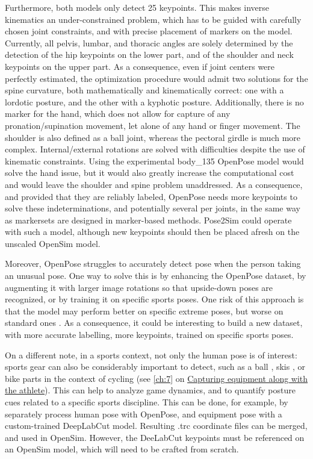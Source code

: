 Furthermore, both models only detect 25 keypoints. This makes inverse kinematics an under-constrained problem, which has to be guided with carefully chosen joint constraints, and with precise placement of markers on the model. Currently, all pelvis, lumbar, and thoracic angles are solely determined by the detection of the hip keypoints on the lower part, and of the shoulder and neck keypoints on the upper part. As a consequence, even if joint centers were perfectly estimated, the optimization procedure would admit two solutions for the spine curvature, both mathematically and kinematically correct: one with a lordotic posture, and the other with a kyphotic posture. Additionally, there is no marker for the hand, which does not allow for capture of any pronation/supination movement, let alone of any hand or finger movement. The shoulder is also defined as a ball joint, whereas the pectoral girdle is much more complex. Internal/external rotations are solved with difficulties despite the use of kinematic constraints. Using the experimental body\_135 OpenPose model would solve the hand issue, but it would also greatly increase the computational cost and would leave the shoulder and spine problem unaddressed. As a consequence, and provided that they are reliably labeled, OpenPose needs more keypoints to solve these indeterminations, and potentially several per joints, in the same way as markersets are designed in marker-based methods. Pose2Sim could operate with such a model, although new keypoints should then be placed afresh on the unscaled OpenSim model. 

Moreover, OpenPose struggles to accurately detect pose when the person taking an unusual pose. One way to solve this is by enhancing the OpenPose dataset, by augmenting it with larger image rotations so that upside-down poses are recognized, or by training it on specific sports poses. One risk of this approach is that the model may perform better on specific extreme poses, but worse on standard ones \cite{Kitamura2022}. As a consequence, it could be interesting to build a new dataset, with more accurate labelling, more keypoints, trained on specific sports poses.

On a different note, in a sports context, not only the human pose is of interest: sports gear can also be considerably important to detect, such as a ball \cite{Ghasemzadeh2021}, skis \cite{Ludwig2020}, or bike parts in the context of cycling (see \autoref{ch:7} on  \hyperref[ch:7]{Capturing equipment along with the athlete}). This can help to analyze game dynamics, and to quantify posture cues related to a specific sports discipline. This can be done, for example, by separately process human pose with OpenPose, and equipment pose with a custom-trained DeepLabCut model. Resulting .trc coordinate files can be merged, and used in OpenSim. However, the DeeLabCut keypoints must be referenced on an OpenSim model, which will need to be crafted from scratch.


